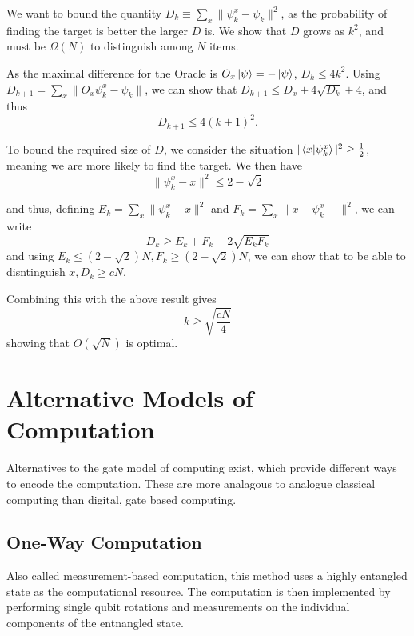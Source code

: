 \documentclass[11pt]{article}
\begin{document}
We want to bound the quantity $D_{k}\equiv \sum_{x} \| \psi_{k}^{x}-\psi_{k}\|^{2}$, as the probability of finding the target is better the larger $D$ is. We show that $D$ grows as $k^{2}$, and must be $\Omega
(N)$ to distinguish among $N$ items.

As the maximal difference for the Oracle is $O_{x}\ket{\psi}=-\ket{\psi}$, $D_{k}\leq 4 k^{2}$. Using
$D_{k+1}=\sum_{x} \| O_{x}\psi_{k}^{x} - \psi_{k}\|$, we can show that $ D_{k+1}\leq D_{x} + 4\sqrt{D_{k}}+4$, and thus
\[ D_{k+1}\leq 4(k+1)^{2}.\]

To bound the required size of $D$, we consider the situation $\vert \braket{x}{\psi_{k}^{x}}\vert^{2}\geq\frac{1}{2}$, meaning we are more likely to find the target. We then have
\[\| \psi_{k}^{x}-x\|^{2}\leq 2-\sqrt{2}\]

and thus, defining $E_{k}=\sum_{x}\| \psi_{k}^{x}-x\|^{2}$ and $F_{k} = \sum_{x}\| x- \psi_{k}^{x}-\|^{2}$, we can write
\[
D_{k}\geq E_{k}+F_{k} -2\sqrt{E_{k}F_{k}}
\]
and using $E_{k}\leq(2-\sqrt{2})N,F_{k}\geq(2-\sqrt{2})N$, we can show that to be able to disntinguish $x, D_{k}\geq cN$.

Combining this with the above result gives
\begin{equation}
    k\geq\sqrt{\frac{cN}{4}}
\end{equation}
showing that $O(\sqrt{N})$ is optimal.

\section{Alternative Models of Computation}
Alternatives to the gate model of computing exist, which provide different ways to encode the computation. These are more analagous to analogue classical computing than digital, gate based computing.

\subsection*{One-Way Computation}

Also called measurement-based computation, this method uses a highly entangled state as the computational resource. The computation is then implemented by performing single qubit rotations and measurements on the individual components of the entnangled state.
\end{document}
